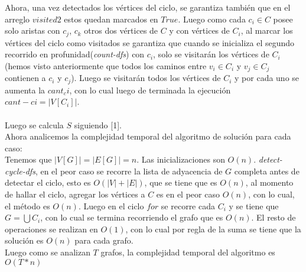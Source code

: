 \documentclass[12pt]{article}
\begin{document}
Ahora, una vez detectados los v\'ertices del ciclo, se garantiza tambi\'en que en el arreglo $visited2$ estos quedan marcados en $True$. 
Luego como cada $c_i\in C$ posee solo aristas con $c_j$, $c_k$ otros dos v\'ertices de $C$ y con v\'ertices de $C_i$, al marcar los v\'ertices del ciclo como visitados se garantiza que cuando se inicializa el segundo recorrido en profunidad(\textit{count-dfs}) con $c_i$, solo se visitar\'an los v\'ertices de $C_i$(hemos visto anteriormente que  todos los caminos entre $v_i\in C_i$ y $v_j\in C_j$ contienen a $c_i$ y $c_j$). Luego se visitar\'an todos los 
v\'ertices de $C_i$ y por cada uno se aumenta la $cant_ci$, con lo cual luego de terminada la 
ejecuci\'on $cant-ci= |V[C_i]|$.\\    
\\
Luego se calcula $S$ siguiendo [1].\\

Ahora analicemos la complejidad temporal del algoritmo de soluci\'on para cada caso:\\
Tenemos que $|V[G]|=|E[G]|= n$. Las inicializaciones son $O(n)$. \textit{detect-cycle-dfs}, en el peor caso se recorre la lista de adyacencia de $G$ completa antes de detectar el ciclo, esto es $O(|V|+|E|)$, que se tiene que es $O(n)$, al momento de hallar el ciclo, agregar los v\'ertices a $C$ es en el peor caso $O(n)$, con lo cual, el m\'etodo es $O(n)$. Luego en el ciclo $for$ se recorre cada $C_i$ y se tiene que \\
 $G=\bigcup C_i$, con lo cual se termina recorriendo el grafo que es $O(n)$. El resto de operaciones se realizan en $O(1)$, con lo cual por 
regla de la suma se tiene que la soluci\'on es $O(n)$ para cada grafo.\\
Luego como  se analizan $T$ grafos, la complejidad temporal del algoritmo es $O(T*n)$

















  
\end{document}
